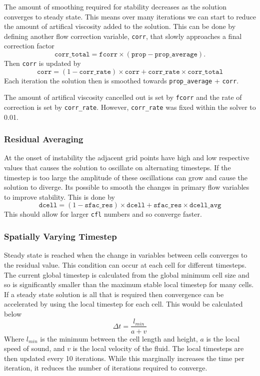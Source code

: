 \documentclass{article}
\begin{document}
The amount of smoothing required for stability decreases as the solution converges to steady state.
This means over many iterations we can start to reduce the amount of artifical viscosity added to the solution.
This can be done by defining another flow correction variable, \texttt{corr}, that slowly approaches a final correction factor
\begin{equation}
    \texttt{corr\_total} = \texttt{fcorr} \times (\texttt{prop} - \texttt{prop\_average}).
\end{equation}
Then \texttt{corr} is updated by
\begin{equation}
    \texttt{corr} = (1 - \texttt{corr\_rate}) \times \texttt{corr} + \texttt{corr\_rate} \times \texttt{corr\_total} \label{eq:corr_rate}
\end{equation}
Each iteration the solution then is smoothed towards \texttt{prop\_average} + \texttt{corr}.

The amount of artifical viscosity cancelled out is set by \texttt{fcorr} and the rate of correction is set by \texttt{corr\_rate}.
However, \texttt{corr\_rate} was fixed within the solver to 0.01.

\subsubsection{Residual Averaging}

At the onset of instability the adjacent grid points have high and low respective values that causes the solution to oscillate on alternating timesteps.
If the timestep is too large the amplitude of these oscillations can grow and cause the solution to diverge.
Its possible to smooth the changes in primary flow variables to improve stability.
This is done by
\begin{equation}
    \texttt{dcell} = (1 - \texttt{sfac\_res}) \times \texttt{dcell} + \texttt{sfac\_res} \times \texttt{dcell\_avg}
\end{equation}
This should allow for larger \texttt{cfl} numbers and so converge faster. 

\subsubsection{Spatially Varying Timestep}

Steady state is reached when the change in variables between cells converges to the residual value.
This condition can occur at each cell for different timesteps.
The current global timestep is calculated from the global minimum cell size and so is significantly smaller than the maximum stable local timestep for many cells.
If a steady state solution is all that is required then convergence can be accelerated by using the local timestep for each cell.
This would be calculated below
\begin{equation}
    \Delta t = \frac{l_{min}}{a + v}
\end{equation}
Where $l_{min}$ is the minimum between the cell length and height, $a$ is the local speed of sound, and $v$ is the local velocity of the fluid.
The local timesteps are then updated every 10 iterations.
While this marginally increases the time per iteration, it reduces the number of iterations required to converge.
\end{document}
